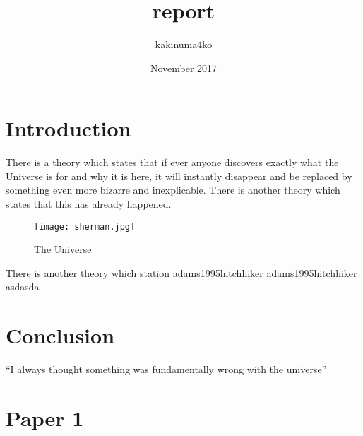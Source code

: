 \documentclass{article}
\title{report}
\author{kakinuma4ko }
\date{November 2017}
\begin{document}
\maketitle

\section{Introduction}
There is a theory which states that if ever anyone discovers exactly what the Universe is for and why it is here, it will instantly disappear and be replaced by something even more bizarre and inexplicable.
There is another theory which states that this has already happened.

\begin{figure}[h!]
\centering
\texttt{[image: sherman.jpg]}
\caption{The Universe}
\label{fig:univerise}
\end{figure}

There is another theory which station adams1995hitchhiker adams1995hitchhiker asdasda

\section{Conclusion}
``I always thought something was fundamentally wrong with the universe'' \citep{adams1995hitchhiker}

\section{Paper 1}

%
\end{document}
